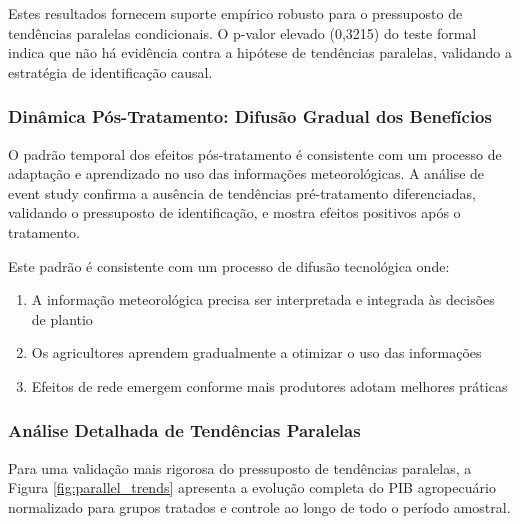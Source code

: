 \documentclass[
	12pt,				%
	oneside,			%
	a4paper,			%
	english,			%
	french,				%
	spanish,			%
	brazil				%
	]{abntex2}
\begin{document}
Estes resultados fornecem suporte empírico robusto para o pressuposto de tendências paralelas condicionais. O p-valor elevado (0,3215) do teste formal indica que não há evidência contra a hipótese de tendências paralelas, validando a estratégia de identificação causal.

\subsubsection{Dinâmica Pós-Tratamento: Difusão Gradual dos Benefícios}

O padrão temporal dos efeitos pós-tratamento é consistente com um processo de adaptação e aprendizado no uso das informações meteorológicas. A análise de event study confirma a ausência de tendências pré-tratamento diferenciadas, validando o pressuposto de identificação, e mostra efeitos positivos após o tratamento.

Este padrão é consistente com um processo de difusão tecnológica onde:
\begin{enumerate}
\item A informação meteorológica precisa ser interpretada e integrada às decisões de plantio
\item Os agricultores aprendem gradualmente a otimizar o uso das informações
\item Efeitos de rede emergem conforme mais produtores adotam melhores práticas
\end{enumerate}

\subsubsection{Análise Detalhada de Tendências Paralelas}

Para uma validação mais rigorosa do pressuposto de tendências paralelas, a Figura \ref{fig:parallel_trends} apresenta a evolução completa do PIB agropecuário normalizado para grupos tratados e controle ao longo de todo o período amostral.
\end{document}
